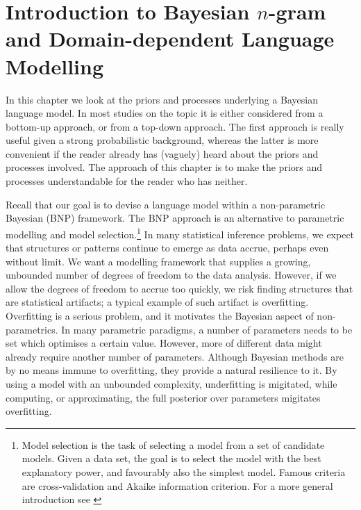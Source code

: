 \chapter{Introduction to Bayesian $n$-gram and Domain-dependent Language Modelling}




In this chapter we look at the priors and processes underlying a Bayesian language model. In most studies on the topic it is either considered from a bottom-up approach, or from a top-down approach. The first approach is really useful given a strong probabilistic background, whereas the latter is more convenient if the reader already has (vaguely) heard about the priors and processes involved. The approach of this chapter is to make the priors and processes understandable for the reader who has neither.

Recall that our goal is to devise a language model within a non-parametric Bayesian (BNP) framework. The BNP approach is an alternative to parametric modelling and model selection.\footnote{Model selection is the task of selecting a model from a set of candidate models. Given a data set, the goal is to select the model with the best explanatory power, and favourably also the simplest model. Famous criteria are cross-validation and \cite{Kohavi1995A} Akaike information criterion.\cite{Bozdogan1987Model} For a more general introduction see \cite{Burnham2002Model} }
In many statistical inference problems, we expect that structures or patterns continue to emerge as data accrue, perhaps even without limit. We want a modelling framework that supplies a growing, unbounded number of degrees of freedom to the data analysis. However, if we allow the degrees of freedom to accrue too quickly, we risk finding structures that are statistical artifacts; a typical example of such artifact is overfitting. Overfitting is a serious problem, and it motivates the Bayesian aspect of non-parametrics. In many parametric paradigms, a number of parameters needs to be set which optimises a certain value. However, more of different data might already require another number of parameters. 
Although Bayesian methods are by no means immune to overfitting, they provide a natural resilience to it. By using a model with an unbounded complexity, underfitting is migitated, while computing, or approximating, the full posterior over parameters migitates overfitting.

